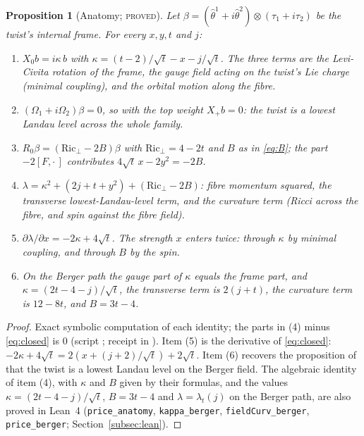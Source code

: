 \documentclass[11pt]{article}
\newtheorem{proposition}[theorem]{Proposition}
\theoremstyle{definition}
\theoremstyle{remark}
\newcommand{\PROVED}{\textsc{proved}}
\begin{document}
\begin{proposition}[Anatomy; \PROVED]\label{prop:anatomy}
Let $\beta=(\hat\theta^1+i\hat\theta^2)\otimes(\tau_1+i\tau_2)$ be the twist's internal frame. For every $x,y,t$ and $j$:
\begin{enumerate}
  \item $X_0b=i\kappa\,b$ with $\kappa=(t-2)/\sqrt t-x-j/\sqrt t$. The three terms are the Levi-Civita rotation of the
    frame, the gauge field acting on the twist's Lie charge (minimal coupling), and the orbital motion along the fibre.
  \item $(\Omega_1+i\Omega_2)\beta=0$, so with the top weight $X_+b=0$: the twist is a lowest Landau level across the
    whole family.
  \item $R_0\beta=(\mathrm{Ric}_\perp-2B)\beta$ with $\mathrm{Ric}_\perp=4-2t$ and $B$ as in \eqref{eq:B}; the part
    $-2[F,\cdot\,]$ contributes $4\sqrt t\,x-2y^2=-2B$.
  \item $\lambda=\kappa^2+(2j+t+y^2)+(\mathrm{Ric}_\perp-2B)$: fibre momentum squared, the transverse lowest-Landau-level
    term, and the curvature term (Ricci across the fibre, and spin against the fibre field).
  \item $\partial\lambda/\partial x=-2\kappa+4\sqrt t$. The strength $x$ enters twice: through $\kappa$ by minimal
    coupling, and through $B$ by the spin.
  \item On the Berger path the gauge part of $\kappa$ equals the frame part, and $\kappa=(2t-4-j)/\sqrt t$, the transverse
    term is $2(j+t)$, the curvature term is $12-8t$, and $B=3t-4$.
\end{enumerate}
\end{proposition}
\begin{proof}
Exact symbolic computation of each identity; the parts in (4) minus \eqref{eq:closed} is $0$
(script ; receipt  in
).
Item (5) is the derivative of \eqref{eq:closed}: $-2\kappa+4\sqrt t=2(x+(j+2)/\sqrt t)+2\sqrt t$. Item (6) recovers the
proposition of~\cite{davisfloor2026} that the twist is a lowest Landau level on the Berger field. The algebraic identity
of item (4), with $\kappa$ and $B$ given by their formulas, and the values $\kappa=(2t-4-j)/\sqrt t$, $B=3t-4$ and
$\lambda=\lambda_t(j)$ on the Berger path, are also proved in Lean~4 (\texttt{price\_anatomy}, \texttt{kappa\_berger},
\texttt{fieldCurv\_berger}, \texttt{price\_berger}; Section~\ref{subsec:lean}).
\end{proof}
\end{document}

